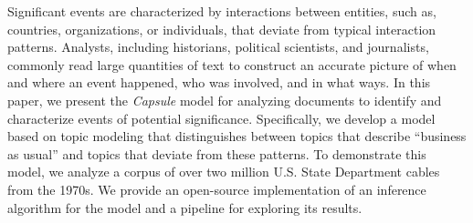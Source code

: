 
Significant events are characterized by interactions between entities,
such as, countries, organizations, or individuals, that deviate from
typical interaction patterns. Analysts, including historians,
political scientists, and journalists, commonly read large quantities
of text to construct an accurate picture of when and where an event
happened, who was involved, and in what ways. In this paper, we
present the \textit{Capsule} model for analyzing documents to identify
and characterize events of potential significance. Specifically, we
develop a model based on topic modeling that distinguishes between
topics that describe ``business as usual'' and topics that deviate
from these patterns. To demonstrate this model, we analyze a corpus of
over two million U.S. State Department cables from the 1970s. We
provide an open-source implementation of an inference algorithm for
the model and a pipeline for exploring its results.
